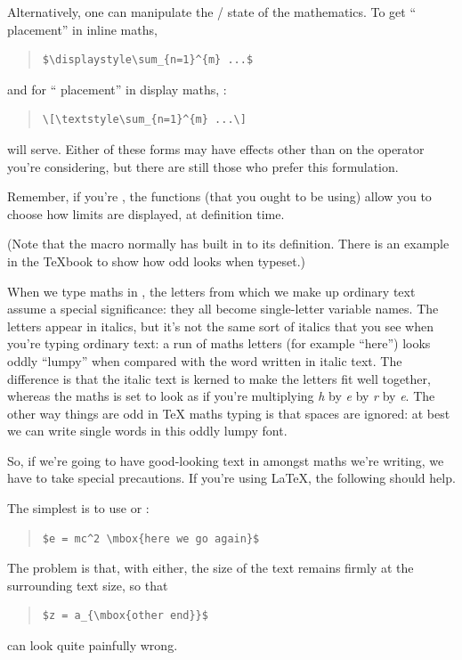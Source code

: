 Alternatively, one can manipulate the
/ state of the mathematics.  To get
`` placement'' in inline maths,
\begin{quote}
\begin{verbatim}
$\displaystyle\sum_{n=1}^{m} ...$
\end{verbatim}
\end{quote}
and for `` placement'' in display maths,
:
\begin{quote}
\begin{verbatim}
\[\textstyle\sum_{n=1}^{m} ...\]
\end{verbatim}
\end{quote}
will serve.  Either of these forms may have effects other than on the
operator you're considering, but there are still those who prefer this
formulation.

Remember, if you're %
, the
\AMSLaTeX{} functions (that you ought to be using) allow you to choose
how limits are displayed, at definition time.

(Note that the macro  normally has  built in to
its definition.  There is an example in the \TeX{}book to show how odd
 looks when typeset.)


When we type maths in \AllTeX{}, the letters from which we make up
ordinary text assume a special significance: they all become
single-letter variable names.  The letters appear in italics, but it's
not the same sort of italics that you see when you're typing ordinary
text: a run of maths letters (for example ``here'') looks oddly
``lumpy'' when compared with the word written in italic text.  The
difference is that the italic text is kerned to make the letters fit
well together, whereas the maths is set to look as if you're
multiplying \emph{h} by \emph{e} by \emph{r} by \emph{e}.  The other
way things are odd in \TeX{} maths typing is that spaces are ignored:
at best we can write single words in this oddly lumpy font.

So, if we're going to have good-looking text in amongst maths we're
writing, we have to take special precautions.  If you're using
\LaTeX{}, the following should help.

The simplest is to use  or :
\begin{quote}
\begin{verbatim}
$e = mc^2 \mbox{here we go again}$
\end{verbatim}
\end{quote}
The problem is that, with either, the size of the text remains firmly
at the surrounding text size, so that
\begin{quote}
\begin{verbatim}
$z = a_{\mbox{other end}}$
\end{verbatim}
\end{quote}
can look quite painfully wrong.


